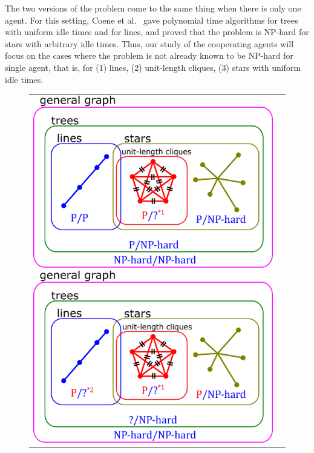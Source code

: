 
The two versions of the problem come to the same thing when there is only one agent.
For this setting, Coene et al.~\cite{coene2011charlemagne} gave 
polynomial time algorithms for trees with uniform idle times and for lines, 
and proved that the problem is NP-hard for stars with arbitrary idle times.
Thus, our study of the cooperating agents will focus on the cases where the problem is not already known to be NP-hard for single agent, that is, for (1) lines, (2) unit-length cliques, (3) stars with uniform idle times.

\begin{figure}[htbp]
  \begin{tabular}{cc}
    \begin{minipage}{0.5\hsize}
      \centering
      \includegraphics[width=\hsize]{../fig1_adjust.pdf}
    \end{minipage}
    \begin{minipage}{0.5\hsize}
      \centering
      \includegraphics[width=\hsize]{../fig2_adjust.pdf}

\end{minipage}
\end{tabular}
\end{figure}
